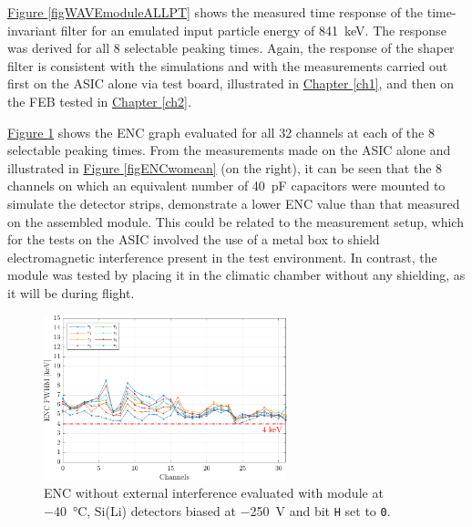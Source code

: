 \par
\hyperref[figWAVEmoduleALLPT]{Figure \ref{figWAVEmoduleALLPT}} shows the measured time response of the time-invariant filter for an emulated input particle energy of \SI{841}{\kilo\electronvolt}. The response was derived for all 8 selectable peaking times. Again, the response of the shaper filter is consistent with the simulations and with the measurements carried out first on the ASIC alone via test board, illustrated in \hyperref[ch1]{Chapter \ref{ch1}}, and then on the FEB tested in \hyperref[ch2]{Chapter \ref{ch2}}.

\par
\hyperref[figENCmodule]{Figure \ref{figENCmodule}} shows the ENC graph evaluated for all 32 channels at each of the 8 selectable peaking times. From the measurements made on the ASIC alone and illustrated in \hyperref[figENCwomean]{Figure \ref{figENCwomean}} (on the right), it can be seen that the 8 channels on which an equivalent number of \SI{40}{\pico\farad} capacitors were mounted to simulate the detector strips, demonstrate a lower ENC value than that measured on the assembled module. This could be related to the measurement setup, which for the tests on the ASIC involved the use of a metal box to shield electromagnetic interference present in the test environment. In contrast, the module was tested by placing it in the climatic chamber without any shielding, as it will be during flight.

\begin{figure}[h!]
    \centering
    \includegraphics[width=0.63\textwidth]{Images/chap3/results/ENC_MODULE_40C_250V.pdf}
    \caption{ENC without external interference evaluated with module at \SI{-40}{\celsius}, Si(Li) detectors biased at \SI{-250}{\volt} and bit \texttt{H} set to \texttt{0}.}
    \label{figENCmodule}
\end{figure}

